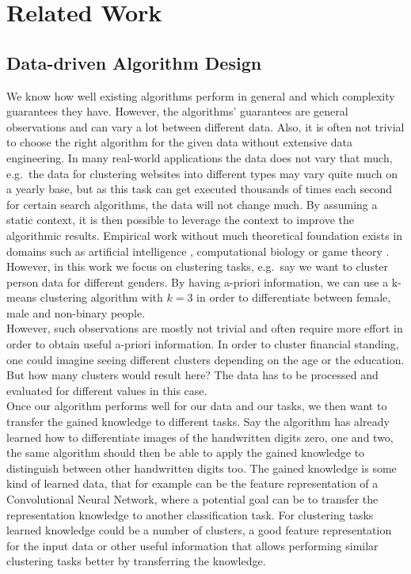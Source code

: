\chapter{Related Work}
\label{chapter:relatedwork}

\section{Data-driven Algorithm Design}

We know how well existing algorithms perform in general and which complexity guarantees they have. However, the algorithms' guarantees are general observations and can vary a lot between different data. Also, it is often not trivial to choose the right algorithm for the given data without extensive data engineering. In many real-world applications the data does not vary that much, e.g.\ the data for clustering websites into different types may vary quite much on a yearly base, but as this task can get executed thousands of times each second for certain search algorithms, the data will not change much. By assuming a static context, it is then possible to leverage the context to improve the algorithmic results. Empirical work without much theoretical foundation exists in domains such as artificial intelligence \cite{Xu:2008:SPA:1622673.1622687}, computational biology \cite{deblasio2018adaptive} or game theory \cite{likhodedov2004methods}. However, in this work we focus on clustering tasks, e.g.\ say we want to cluster person data for different genders. By having a-priori information, we can use a k-means clustering algorithm with $k = 3$ in order to differentiate between female, male and non-binary people.\\

However, such observations are mostly not trivial and often require more effort in order to obtain useful a-priori information. In order to cluster financial standing, one could imagine seeing different clusters depending on the age or the education. But how many clusters would result here? The data has to be processed and evaluated for different values in this case.\\

Once our algorithm performs well for our data and our tasks, we then want to transfer the gained knowledge to different tasks. Say the algorithm has already learned how to differentiate images of the handwritten digits zero, one and two, the same algorithm should then be able to apply the gained knowledge to distinguish between other handwritten digits too. The gained knowledge is some kind of learned data, that for example can be the feature representation of a Convolutional Neural Network, where a potential goal can be to transfer the representation knowledge to another classification task. For clustering tasks learned knowledge could be a number of clusters, a good feature representation for the input data or other useful information that allows performing similar clustering tasks better by transferring the knowledge.\\

